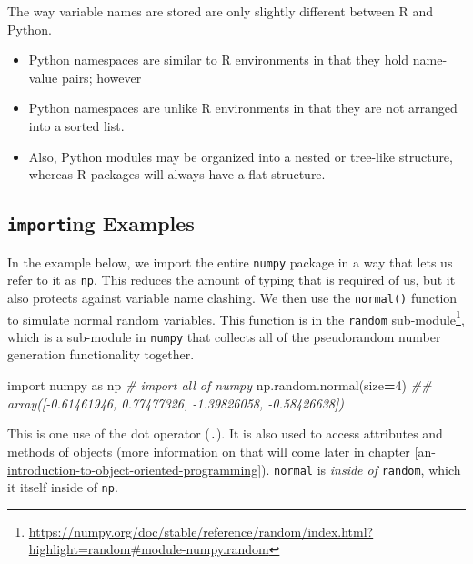 \documentclass[
  12pt,
  krantz2]{krantz}
\makeatletter
\newenvironment{Shaded}{\begin{snugshade}}{\end{snugshade}}
\newcommand{\CommentTok}[1]{\textcolor[rgb]{0.37,0.37,0.37}{\textit{#1}}}
\newcommand{\DecValTok}[1]{\textcolor[rgb]{0.06,0.06,0.06}{#1}}
\newcommand{\ImportTok}[1]{#1}
\newcommand{\NormalTok}[1]{#1}
\newcommand{\OperatorTok}[1]{\textcolor[rgb]{0.43,0.43,0.43}{\textbf{#1}}}
\providecommand{\tightlist}{%
  \setlength{\itemsep}{0pt}\setlength{\parskip}{0pt}}
\renewcommand{\href}[2]{#2\footnote{\url{#1}}}
\newenvironment{kframe}{%
\medskip{}
\setlength{\fboxsep}{.8em}
 \def\at@end@of@kframe{}%
 \ifinner\ifhmode%
  \def\at@end@of@kframe{\end{minipage}}%
  \begin{minipage}{\columnwidth}%
 \fi\fi%
 \def\FrameCommand##1{\hskip\@totalleftmargin \hskip-\fboxsep
 \colorbox{shadecolor}{##1}\hskip-\fboxsep
     \hskip-\linewidth \hskip-\@totalleftmargin \hskip\columnwidth}%
 \MakeFramed {\advance\hsize-\width
   \@totalleftmargin\z@ \linewidth\hsize
   \@setminipage}}%
 {\par\unskip\endMakeFramed%
 \at@end@of@kframe}
\renewenvironment{Shaded}{\begin{kframe}}{\end{kframe}}
\makeatother
\begin{document}
\begin{rmd-details}
The way variable names are stored are only slightly different between R and Python.

\begin{itemize}
\tightlist
\item
  Python namespaces are similar to R environments in that they hold name-value pairs; however
\item
  Python namespaces are unlike R environments in that they are not arranged into a sorted list.
\item
  Also, Python modules may be organized into a nested or tree-like structure, whereas R packages will always have a flat structure.
\end{itemize}

\end{rmd-details}

\hypertarget{importing-examples}{%
\subsection{\texorpdfstring{\texttt{import}ing Examples}{importing Examples}}\label{importing-examples}}

In the example below, we import the entire \texttt{numpy} package in a way that lets us refer to it as \texttt{np}. This reduces the amount of typing that is required of us, but it also protects against variable name clashing. We then use the \texttt{normal()} function to simulate normal random variables. This function is in the \href{https://numpy.org/doc/stable/reference/random/index.html?highlight=random\#module-numpy.random}{\texttt{random} sub-module}, which is a sub-module in \texttt{numpy} that collects all of the pseudorandom number generation functionality together.

\begin{Shaded}
\begin{Highlighting}[]
\ImportTok{import}\NormalTok{ numpy }\ImportTok{as}\NormalTok{ np }\CommentTok{\# import all of numpy}
\NormalTok{np.random.normal(size}\OperatorTok{=}\DecValTok{4}\NormalTok{)}
\CommentTok{\#\# array([{-}0.61461946,  0.77477326, {-}1.39826058, {-}0.58426638])}
\end{Highlighting}
\end{Shaded}

This is one use of the dot operator (\texttt{.}). It is also used to access attributes and methods of objects (more information on that will come later in chapter \ref{an-introduction-to-object-oriented-programming}). \texttt{normal} is \emph{inside of} \texttt{random}, which it itself inside of \texttt{np}.
\end{document}
